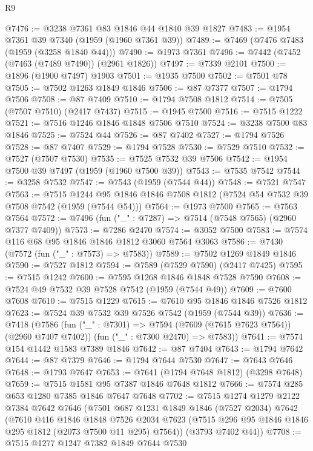 \begin{lexlean}{R9}
\begin{coremodule}
@7476 := @3238 @7361 @83 @1846 @44 @1840 @39 @1827
@7483 := @1954 @7361 @39 @7340 (@1959 (@1960 @7361 @39))
@7489 := @7469 (@7476 @7483 (@1959 (@3258 @1840 @44)))
@7490 := @1973 @7361
@7496 := @7442 (@7452 (@7463 (@7489 @7490)) (@2961 @1826))
@7497 := @7339 @2101
@7500 := @1896 (@1900 @7497) @1903
@7501 := @1935 @7500
@7502 := @7501 @78
@7505 := @7502 @1263 @1849 @1846
@7506 := @87 @7377
@7507 := @1794 @7506
@7508 := @87 @7409
@7510 := @1794 @7508 @1812
@7514 := @7505 (@7507 @7510) (@2417 @7437)
@7515 := @1945 @7500
@7516 := @7515 @1222
@7521 := @7516 @1246 @1846 @1848 @7506 @7510
@7524 := @3238 @7500 @83 @1846
@7525 := @7524 @44
@7526 := @87 @7402
@7527 := @1794 @7526
@7528 := @87 @7407
@7529 := @1794 @7528
@7530 := @7529 @7510
@7532 := @7527 (@7507 @7530)
@7535 := @7525 @7532 @39 @7506
@7542 := @1954 @7500 @39 @7497 (@1959 (@1960 @7500 @39))
@7543 := @7535 @7542
@7544 := @3258 @7532
@7547 := @7543 (@1959 (@7544 @44))
@7548 := @7521 @7547
@7563 := @7515
    @1244
    @95
    @1846
    @1846
    @7508
    @1812
    (@7524 @54 @7532 @39 @7508 @7542 (@1959 (@7544 @54)))
@7564 := @1973 @7500
@7565 := @7563 @7564
@7572 := @7496 (fun ("_" : @7287) => @7514 (@7548 @7565) (@2960 @7377 @7409))
@7573 := @7286 @2470
@7574 := @3052 @7500
@7583 := @7574 @116 @68 @95 @1846 @1846 @1812 @3060 @7564 @3063
@7586 := @7430 (@7572 (fun ("_" : @7573) => @7583))
@7589 := @7502 @1269 @1849 @1846
@7590 := @7527 @1812
@7594 := @7589 (@7529 @7590) (@2417 @7425)
@7595 := @7515 @1242
@7600 := @7595 @1268 @1846 @1848 @7528 @7590
@7608 := @7524 @49 @7532 @39 @7528 @7542 (@1959 (@7544 @49))
@7609 := @7600 @7608
@7610 := @7515 @1229
@7615 := @7610 @95 @1846 @1846 @7526 @1812
@7623 := @7524 @39 @7532 @39 @7526 @7542 (@1959 (@7544 @39))
@7636 := @7418
    (@7586
      (fun ("_" : @7301) => @7594 (@7609 (@7615 @7623 @7564)) (@2960 @7407 @7402))
      (fun ("_" : @7300 @2470) => @7583))
@7641 := @7574 @154 @1442 @1583 @7389 @1846
@7642 := @87 @7404
@7643 := @1794 @7642
@7644 := @87 @7379
@7646 := @1794 @7644 @7530
@7647 := @7643 @7646
@7648 := @1793 @7647
@7653 := @7641 (@1794 @7648 @1812) (@3298 @7648)
@7659 := @7515 @1581 @95 @7387 @1846 @7648 @1812
@7666 := @7574 @285 @653 @1280 @7385 @1846 @7647 @7648
@7702 := @7515
    @1274
    @1279
    @2122
    @7384
    @7642
    @7646
    (@7501
      @687
      @1231
      @1849
      @1846
      (@7527 @2034)
      @7642
      (@7610
        @416
        @1846
        @1848
        @7526
        @2034
        @7623
        (@7515 @296 @95 @1846 @1846 @295 @1812 (@2073 @7500 @11 @295) @7564))
      (@3793 @7402 @44))
@7708 := @7515 @1277 @1247 @7382 @1849 @7644 @7530

\end{coremodule}
\end{lexlean}
